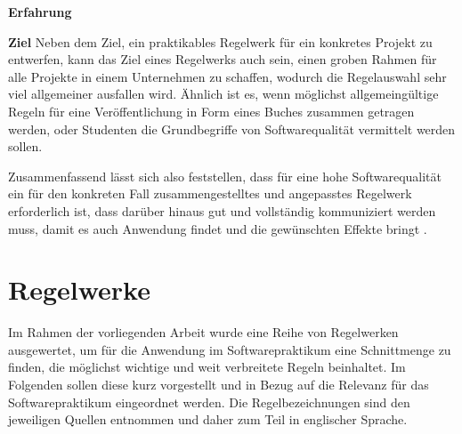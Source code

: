 \documentclass[da,ngerman]{stthesis}
\begin{document}
\begin{labeling}{\textbf{Erfahrung}}
				  \item [\textbf{Ziel}] Neben dem Ziel, ein praktikables Regelwerk für ein konkretes Projekt zu entwerfen, kann das Ziel eines Regelwerks auch sein, einen groben Rahmen für alle Projekte in einem Unternehmen zu schaffen, wodurch die Regelauswahl sehr viel allgemeiner ausfallen wird. Ähnlich ist es, wenn möglichst allgemeingültige Regeln für eine Veröffentlichung in Form eines Buches zusammen getragen werden, oder Studenten die Grundbegriffe von Softwarequalität vermittelt werden sollen.
			\end{labeling}
			Zusammenfassend lässt sich also feststellen, dass für eine hohe Softwarequalität ein für den konkreten Fall zusammengestelltes und angepasstes Regelwerk erforderlich ist, dass darüber hinaus gut und vollständig kommuniziert werden muss, damit es auch Anwendung findet und die gewünschten Effekte bringt \cite{ImproveCodeQuality}.
		\section{Regelwerke} \label{regelwerke}
			Im Rahmen der vorliegenden Arbeit wurde eine Reihe von Regelwerken ausgewertet, um für die Anwendung im Softwarepraktikum eine Schnittmenge zu finden, die möglichst wichtige und weit verbreitete Regeln beinhaltet. Im Folgenden sollen diese kurz vorgestellt und in Bezug auf die Relevanz für das Softwarepraktikum eingeordnet werden. Die Regelbezeichnungen sind den jeweiligen Quellen entnommen und daher zum Teil in englischer Sprache.
\end{document}
